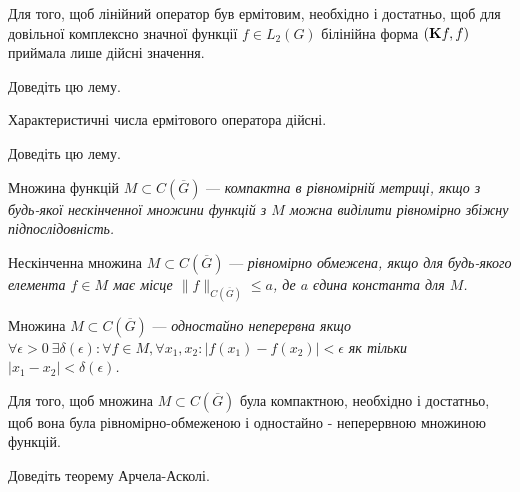 \begin{lemma}
	Для того, щоб лінійний оператор був ермітовим, необхідно і достатньо, щоб для довільної комплексно значної функції $f \in L_2\left( G\right)$ білінійна форма $(\bf{K}f, f)$ приймала лише дійсні значення.
\end{lemma}

\begin{exercise}
	Доведіть цю лему.
\end{exercise}

\begin{lemma}
	Характеристичні числа ермітового оператора дійсні.
\end{lemma}

\begin{exercise}
	Доведіть цю лему.
\end{exercise}

\begin{definition}
	Множина функцій $M \subset C\left(\overline G\right)$ --- \it{компактна в рівномірній метриці}, якщо з будь-якої нескінченної множини функцій з $M$ можна виділити рівномірно збіжну підпослідовність.
\end{definition}

\begin{definition}
	Нескінченна множина $M \subset C\left(\overline G\right)$ --- \it{рівномірно обмежена}, якщо для будь-якого елемента $f \in M$ має місце $\|f\|_{C(\overline G)} \le a$, де $a$ єдина константа для $M$.
\end{definition}

\begin{definition}
	Множина $M \subset C\left(\overline G\right)$ --- \it{одностайно неперервна} якщо $\forall \epsilon >0  \:\exists \delta(\epsilon): \forall f \in M, \forall x_1, x_2: |f(x_1) - f(x_2)| < \epsilon$ як тільки $|x_1 - x_2| < \delta(\epsilon)$.
\end{definition}

\begin{theorem}
	Для того, щоб множина $M \subset C\left(\overline G\right)$ була компактною, необхідно і достатньо, щоб вона була рівномірно-обмеженою і    одностайно - неперервною множиною функцій.
\end{theorem}

\begin{sproblem}
	Доведіть теорему Арчела-Асколі.
\end{sproblem}


